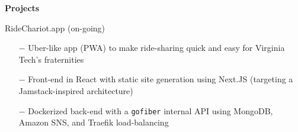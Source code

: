 \documentclass{article}
\newcommand{\code}[1]{\texttt{#1}} %
\begin{document}
{%
% 
% 
% 
% 

\setlength{\leftskip}{0cm}
\textbf{\large{Projects}} 

\vspace{5pt}

{\setlength{\leftskip}{15pt}

	{\selectfont RideChariot.app (on-going)}
	\vspace{-5pt}
	\begin{itemize}
		\setlength{\leftskip}{15pt}
		\setlength\itemsep{-0.5em}
		\item[$-$] Uber-like app (PWA) to make ride-sharing quick and easy for Virginia Tech's fraternities
		\item[$-$] Front-end in React with static site generation using Next.JS (targeting a Jamstack-inspired architecture)
		\item[$-$] Dockerized back-end with a \code{gofiber} internal API using MongoDB, Amazon SNS, and Traefik load-balancing
	\end{itemize}

}}
\end{document}
